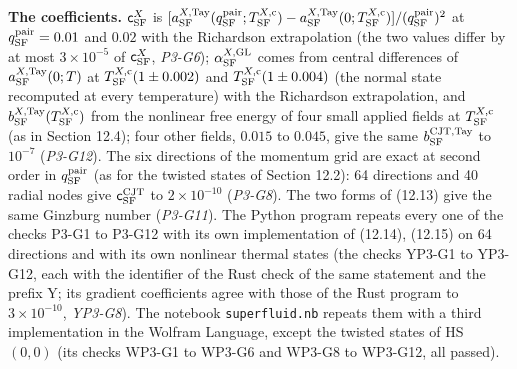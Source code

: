 \documentclass[
  10pt,
]{article}
\begin{document}
\textbf{The coefficients.} \(\mathsf c^X_{\rm SF}\) is
\([a^{X,{\rm Tay}}_{\rm SF}(q^{\rm pair}_{\rm SF};T^{X,{\rm c}}_{\rm SF})-a^{X,{\rm Tay}}_{\rm SF}(0;T^{X,{\rm c}}_{\rm SF})]/(q^{\rm pair}_{\rm SF})^2\)
at \(q^{\rm pair}_{\rm SF}=0.01\) and \(0.02\) with the Richardson
extrapolation (the two values differ by at most \(3\times10^{-5}\) of
\(\mathsf c^X_{\rm SF}\), \emph{P3-G6});
\(\alpha^{X,{\rm GL}}_{\rm SF}\) comes from central differences of
\(a^{X,{\rm Tay}}_{\rm SF}(0;T)\) at
\(T^{X,{\rm c}}_{\rm SF}(1\pm0.002)\) and
\(T^{X,{\rm c}}_{\rm SF}(1\pm0.004)\) (the normal state recomputed at
every temperature) with the Richardson extrapolation, and
\(b^{X,{\rm Tay}}_{\rm SF}(T^{X,{\rm c}}_{\rm SF})\) from the nonlinear
free energy of four small applied fields at \(T^{X,{\rm c}}_{\rm SF}\)
(as in Section 12.4); four other fields, \(0.015\) to \(0.045\), give
the same \(b^{\rm CJT,Tay}_{\rm SF}\) to \(10^{-7}\) (\emph{P3-G12}).
The six directions of the momentum grid are exact at second order in
\(q^{\rm pair}_{\rm SF}\) (as for the twisted states of Section 12.2):
64 directions and 40 radial nodes give \(\mathsf c^{\rm CJT}_{\rm SF}\)
to \(2\times10^{-10}\) (\emph{P3-G8}). The two forms of (12.13) give the
same Ginzburg number (\emph{P3-G11}). The Python program repeats every
one of the checks P3-G1 to P3-G12 with its own implementation of
(12.14), (12.15) on 64 directions and with its own nonlinear thermal
states (the checks YP3-G1 to YP3-G12, each with the identifier of the
Rust check of the same statement and the prefix Y; its gradient
coefficients agree with those of the Rust program to
\(3\times10^{-10}\), \emph{YP3-G8}). The notebook \texttt{superfluid.nb}
repeats them with a third implementation in the Wolfram Language, except
the twisted states of HS \((0,0)\) (its checks WP3-G1 to WP3-G6 and
WP3-G8 to WP3-G12, all passed).
\end{document}
